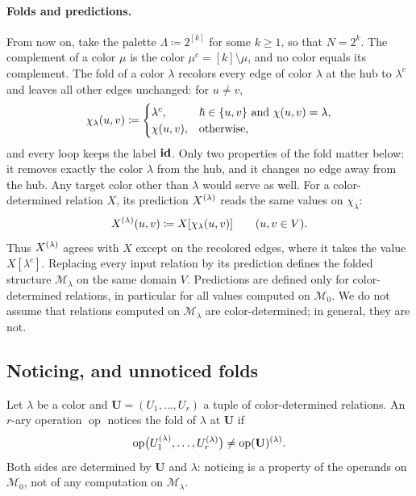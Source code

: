 \paragraph{Folds and predictions.}
From now on, take the palette $\Lambda\coloneqq2^{[k]}$ for some $k\ge1$, so that
$N=2^k$. The complement of a color $\mu$ is the color
$\mu^c=[k]\setminus\mu$, and no color equals its complement. The fold of
a color $\lambda$ recolors every edge of color $\lambda$ at the hub to
$\lambda^c$ and leaves all other edges unchanged: for $u\ne v$,
\[
 \chi_\lambda(u,v)\coloneqq
 \begin{cases}\lambda^c,&\hslash\in\{u,v\}\text{ and }\chi(u,v)=\lambda,\\
 \chi(u,v),&\text{otherwise},
 \end{cases}
\]
and every loop keeps the label $\mathbf{id}$. Only two properties of the fold
matter below: it removes exactly the color $\lambda$ from the hub, and
it changes no edge away from the hub. Any target color other than
$\lambda$ would serve as well. For a color-determined relation $X$,
its prediction $X^{(\lambda)}$ reads the same values on $\chi_\lambda$:
\[
 X^{(\lambda)}(u,v)\coloneqq X[\chi_\lambda(u,v)]\qquad(u,v\in V).
\]
Thus $X^{(\lambda)}$ agrees with $X$ except on the recolored edges,
where it takes the value $X[\lambda^c]$. Replacing every input relation
by its prediction defines the folded structure $\mathcal M_\lambda$ on
the same domain $V$. Predictions are defined only for color-determined relations, in
particular for all values computed on $\mathcal M_0$. We do not assume
that relations computed on $\mathcal M_\lambda$ are color-determined;
in general, they are not.

\subsection{Noticing, and unnoticed folds}\label{sec:unnoticed}
Let $\lambda$ be a color and $\mathbf U=(U_1,\ldots,U_r)$ a tuple of
color-determined relations. An $r$-ary operation $\operatorname{op}$
notices the fold of $\lambda$ at $\mathbf U$ if
\[
 \operatorname{op}\bigl(U_1^{(\lambda)},\ldots,U_r^{(\lambda)}\bigr)\ne
 \operatorname{op}(\mathbf U)^{(\lambda)}.
\]
Both sides are determined by $\mathbf U$ and $\lambda$: noticing is a
property of the operands on $\mathcal M_0$, not of any computation on
$\mathcal M_\lambda$.

